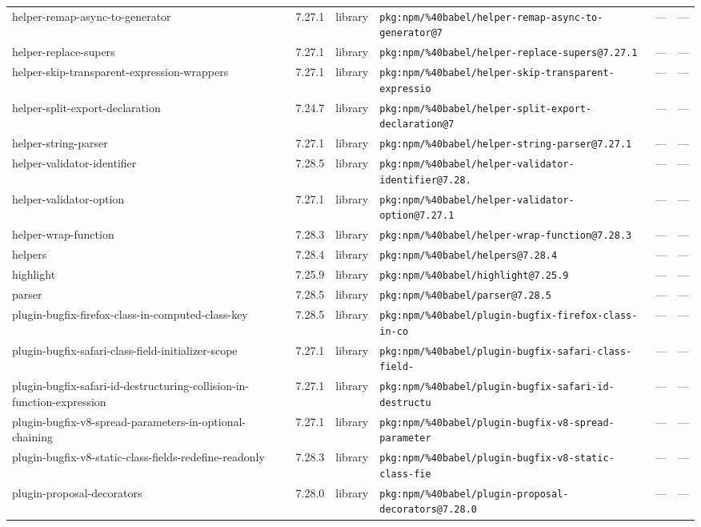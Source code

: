 \documentclass[11pt]{article}
\begin{document}
\begin{longtable}{|l|l|l|p{2.2cm}|l|p{4cm}|}
helper-remap-async-to-generator & 7.27.1 & library & \texttt{pkg:npm/\%40babel/helper-remap-async-to-generator@7} & — & — \\
helper-replace-supers & 7.27.1 & library & \texttt{pkg:npm/\%40babel/helper-replace-supers@7.27.1} & — & — \\
helper-skip-transparent-expression-wrappers & 7.27.1 & library & \texttt{pkg:npm/\%40babel/helper-skip-transparent-expressio} & — & — \\
helper-split-export-declaration & 7.24.7 & library & \texttt{pkg:npm/\%40babel/helper-split-export-declaration@7} & — & — \\
helper-string-parser & 7.27.1 & library & \texttt{pkg:npm/\%40babel/helper-string-parser@7.27.1} & — & — \\
helper-validator-identifier & 7.28.5 & library & \texttt{pkg:npm/\%40babel/helper-validator-identifier@7.28.} & — & — \\
helper-validator-option & 7.27.1 & library & \texttt{pkg:npm/\%40babel/helper-validator-option@7.27.1} & — & — \\
helper-wrap-function & 7.28.3 & library & \texttt{pkg:npm/\%40babel/helper-wrap-function@7.28.3} & — & — \\
helpers & 7.28.4 & library & \texttt{pkg:npm/\%40babel/helpers@7.28.4} & — & — \\
highlight & 7.25.9 & library & \texttt{pkg:npm/\%40babel/highlight@7.25.9} & — & — \\
parser & 7.28.5 & library & \texttt{pkg:npm/\%40babel/parser@7.28.5} & — & — \\
plugin-bugfix-firefox-class-in-computed-class-key & 7.28.5 & library & \texttt{pkg:npm/\%40babel/plugin-bugfix-firefox-class-in-co} & — & — \\
plugin-bugfix-safari-class-field-initializer-scope & 7.27.1 & library & \texttt{pkg:npm/\%40babel/plugin-bugfix-safari-class-field-} & — & — \\
plugin-bugfix-safari-id-destructuring-collision-in-function-expression & 7.27.1 & library & \texttt{pkg:npm/\%40babel/plugin-bugfix-safari-id-destructu} & — & — \\
plugin-bugfix-v8-spread-parameters-in-optional-chaining & 7.27.1 & library & \texttt{pkg:npm/\%40babel/plugin-bugfix-v8-spread-parameter} & — & — \\
plugin-bugfix-v8-static-class-fields-redefine-readonly & 7.28.3 & library & \texttt{pkg:npm/\%40babel/plugin-bugfix-v8-static-class-fie} & — & — \\
plugin-proposal-decorators & 7.28.0 & library & \texttt{pkg:npm/\%40babel/plugin-proposal-decorators@7.28.0} & — & — \\

\end{longtable}
\end{document}
